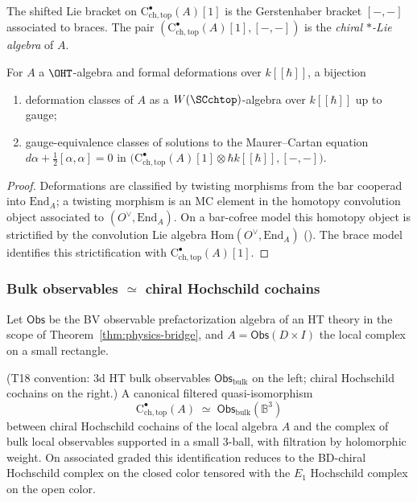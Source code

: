 \begin{definition}
\label{def:star-Lie}
The shifted Lie bracket on $\mathrm{C}^\bullet_{\mathrm{ch,top}}(A)[1]$ is the Gerstenhaber bracket $[-,-]$ associated to braces. The pair $(\mathrm{C}^\bullet_{\mathrm{ch,top}}(A)[1],[-,-])$ is the \emph{chiral $\ast$-Lie algebra} of $A$.
\end{definition}

\begin{theorem}
\label{thm:MC-deformations}
For $A$ a $\OHT$-algebra and formal deformations over $k[\![\hbar]\!]$, a bijection
\begin{enumerate}[label=(\alph*)]
 \item deformation classes of $A$ as a $W(\SCchtop)$-algebra over $k[\![\hbar]\!]$ up to gauge;
 \item gauge-equivalence classes of solutions to the Maurer--Cartan equation
 \(
 d\alpha + \tfrac{1}{2}[\alpha,\alpha]=0
 \)
 in $\bigl(\mathrm{C}^\bullet_{\mathrm{ch,top}}(A)[1]\otimes \hbar k[\![\hbar]\!],[-,-]\bigr)$.
\end{enumerate}
\end{theorem}

\begin{proof}
Deformations are classified by twisting morphisms from the bar cooperad into $\mathrm{End}_A$; a twisting morphism is an MC element in the homotopy convolution object associated to $(O^\vee,\mathrm{End}_A)$. On a bar-cofree model this homotopy object is strictified by the convolution Lie algebra $\mathrm{Hom}(O^\vee,\mathrm{End}_A)$ (\cite{GK94,Val07}). The brace model identifies this strictification with $\mathrm{C}^\bullet_{\mathrm{ch,top}}(A)[1]$.
\end{proof}

\subsubsection{\texorpdfstring{Bulk observables $\simeq$ chiral Hochschild cochains}{Bulk observables equivalent to chiral Hochschild cochains}}
\label{subsec:bulk-equals-CHC}
Let $\mathsf{Obs}$ be the BV observable prefactorization algebra of an HT theory in the scope of Theorem~\ref{thm:physics-bridge}, and $A=\mathsf{Obs}(D\times I)$ the local complex on a small rectangle.

\begin{theorem}
\label{thm:bulk-CHC}
(T18 convention: 3d HT bulk observables $\mathsf{Obs}_{\mathrm{bulk}}$ on the left; chiral Hochschild cochains on the right.)
A canonical filtered quasi-isomorphism
\[
\mathrm{C}^\bullet_{\mathrm{ch,top}}(A)\;\simeq\;\mathsf{Obs}_{\mathrm{bulk}}(\mathbb{B}^3)
\]
between chiral Hochschild cochains of the local algebra $A$ and the complex of bulk local observables supported in a small $3$-ball, with filtration by holomorphic weight. On associated graded this identification reduces to the BD-chiral Hochschild complex on the closed color tensored with the $E_1$ Hochschild complex on the open color.
\end{theorem}

